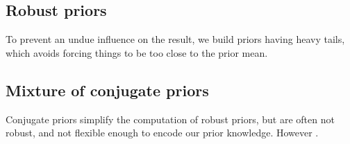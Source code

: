 \subsection{Robust priors}
To prevent an undue influence on the result, we build priors having heavy tails, which 
avoids forcing things to be too close to the prior mean.

\subsection{Mixture of conjugate priors}
Conjugate priors simplify the computation of robust priors, but are often not robust, and 
not flexible enough to encode our prior knowledge. However .


